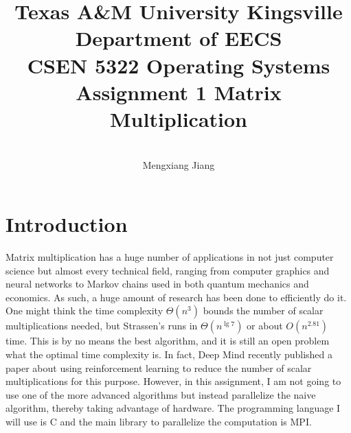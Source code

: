 \documentclass[12pt]{report}
\begin{document}
 
 
\title{Texas A\&M University Kingsville\\
Department of EECS\\
CSEN 5322 Operating Systems\\
Assignment 1 Matrix Multiplication
}%
\author{\\
Mengxiang Jiang %
} %
 
\maketitle

\tableofcontents

\chapter{Introduction}
Matrix multiplication has a huge number of applications in not just computer science but almost every technical field, 
ranging from computer graphics and neural networks to Markov chains used in both quantum mechanics and economics. As such,
a huge amount of research has been done to efficiently do it. One might think the time complexity $\Theta(n^3)$ bounds the number of scalar multiplications needed, but
Strassen's runs in $\Theta(n^{\lg{7}})$ or about $O(n^{2.81})$ time.\cite{clrs} This is by no means the best algorithm, and it is still an open problem what the optimal time complexity is.
In fact, Deep Mind recently published a paper about using reinforcement learning to reduce the number of scalar multiplications for this purpose.\cite{Fawzi2022}
However, in this assignment, I am not going to use one of the more advanced algorithms but instead parallelize the naive algorithm,
thereby taking advantage of hardware. The programming language I will use is C and the main library to parallelize the computation is MPI.
\end{document}
